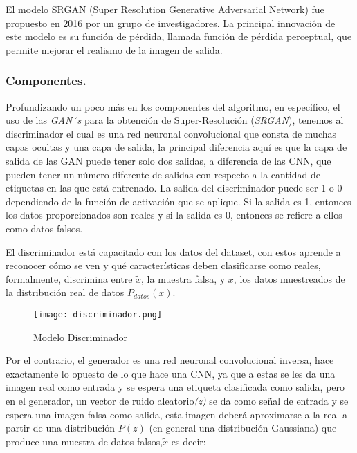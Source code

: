 El modelo SRGAN (Super Resolution Generative Adversarial Network) fue
propuesto en 2016 por un grupo de investigadores\cite{SRGAN}.
La principal innovación de este modelo es su función de pérdida, llamada
función de pérdida perceptual, que permite mejorar el realismo de la imagen de
salida.

\subsubsection{Componentes.}

Profundizando un poco más en los componentes del algoritmo, en especifico, el uso de las \emph{GAN´s} para la obtención de Super-Resolución (\emph{SRGAN}), 
tenemos al discriminador el cual es una red neuronal convolucional que consta de muchas 
capas ocultas y una capa de salida, la principal diferencia aquí es que la capa de salida de las GAN puede tener solo dos salidas, 
a diferencia de las CNN, que pueden tener un número diferente de salidas con respecto a la cantidad de etiquetas en las que está entrenado.
La salida del discriminador puede ser 1 o 0 dependiendo de la función de activación que se aplique. Si la salida es 1, 
entonces los datos proporcionados son reales y si la salida es 0, entonces se refiere a ellos como datos falsos.

El discriminador está capacitado con los datos del dataset, con estos aprende a reconocer cómo se ven y qué características deben 
clasificarse como reales, formalmente, discrimina entre $\tilde{x}$, la muestra falsa, y $x$, 
los datos muestreados de la distribución real de datos $P_{datos}(x)$.




\begin{figure}[H]
    \begin{center}
      \texttt{[image: discriminador.png]}
      \caption{Modelo Discriminador}
      \label{Alexis2}
    \end{center}
\end{figure}


Por el contrario, el generador es una red neuronal convolucional inversa, hace exactamente lo opuesto de lo que hace una CNN, ya que 
a estas se les da una imagen real como entrada y se espera una etiqueta clasificada como salida, 
pero en el generador, un vector de ruido aleatorio\emph{(z)} se da como señal de entrada 
y se espera una imagen falsa como salida, esta imagen deberá aproximarse a la real a
partir de una distribución $P(z)$ (en general una distribución Gaussiana) que
produce una muestra de datos falsos,$\tilde{x}$ es decir:

